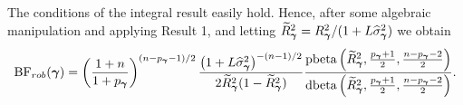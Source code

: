 \noindent The conditions of the integral result easily hold.
%
%
%
%
%
%
Hence, after some algebraic manipulation and applying Result 1, and letting
$\widetilde{R}_{\boldsymbol \gamma}^2 = R_{\boldsymbol \gamma}^2/(1 + L\widehat{\sigma}_{\boldsymbol \gamma}^2)$ we
obtain
\begin{equation}\label{eq:yGivenGammaRobust2}
	\displaystyle \mbox{BF}_{{rob}}({\boldsymbol \gamma})
	= \left( \frac{1 + n}{1 + p_{\boldsymbol \gamma}} \right)^{(n - p_{\boldsymbol \gamma} - 1)/2} \frac{\left( 1 + L\widehat{\sigma}_{\boldsymbol \gamma}^2 \right)^{-(n - 1)/2}}{2 \widetilde{R}_{\boldsymbol \gamma}^2(1 - \widetilde{R}_{\boldsymbol \gamma}^2)} 
	\frac{
		\mbox{pbeta}\left( 
		\widetilde{R}_{\boldsymbol \gamma}^2,
		\frac{p_{\boldsymbol \gamma} +1}{2},
		\frac{n - p_{\boldsymbol \gamma} - 2}{2} 
		\right)
	}{
		\mbox{dbeta}\left( 
		\widetilde{R}_{\boldsymbol \gamma}^2,
		\frac{p_{\boldsymbol \gamma} +1}{2},
		\frac{n - p_{\boldsymbol \gamma} - 2}{2} 
		\right)
	}.
\end{equation}
